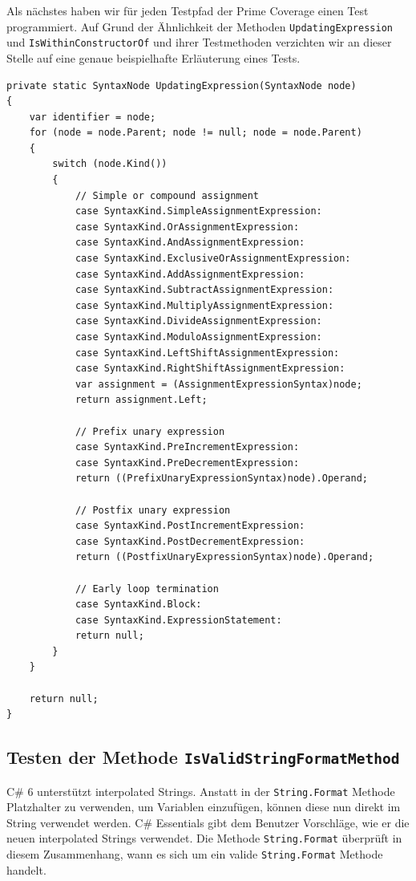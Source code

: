 Als nächstes haben wir für jeden Testpfad der Prime Coverage einen Test programmiert. Auf Grund der Ähnlichkeit der Methoden \texttt{UpdatingExpression} und \texttt{IsWithinConstructorOf} und ihrer Testmethoden verzichten wir an dieser Stelle auf eine genaue beispielhafte Erläuterung eines Tests.\newpage
\begin{lstlisting}[caption={Mehtode \texttt{UpdatingExpression}},
label=lst:code-UpdatingExpression]
private static SyntaxNode UpdatingExpression(SyntaxNode node)
{
	var identifier = node;
 	for (node = node.Parent; node != null; node = node.Parent)
 	{
 		switch (node.Kind())
 		{
 			// Simple or compound assignment
 			case SyntaxKind.SimpleAssignmentExpression:
 			case SyntaxKind.OrAssignmentExpression:
 			case SyntaxKind.AndAssignmentExpression:
 			case SyntaxKind.ExclusiveOrAssignmentExpression:
 			case SyntaxKind.AddAssignmentExpression:
 			case SyntaxKind.SubtractAssignmentExpression:
 			case SyntaxKind.MultiplyAssignmentExpression:
 			case SyntaxKind.DivideAssignmentExpression:
 			case SyntaxKind.ModuloAssignmentExpression:
 			case SyntaxKind.LeftShiftAssignmentExpression:
 			case SyntaxKind.RightShiftAssignmentExpression:
 			var assignment = (AssignmentExpressionSyntax)node;
 			return assignment.Left;
 			
 			// Prefix unary expression
 			case SyntaxKind.PreIncrementExpression:
 			case SyntaxKind.PreDecrementExpression:
 			return ((PrefixUnaryExpressionSyntax)node).Operand;
 			
 			// Postfix unary expression
 			case SyntaxKind.PostIncrementExpression:
 			case SyntaxKind.PostDecrementExpression:
 			return ((PostfixUnaryExpressionSyntax)node).Operand;
 			
 			// Early loop termination
 			case SyntaxKind.Block:
 			case SyntaxKind.ExpressionStatement:
 			return null;
 		}
 	}
 	
	return null;
}
\end{lstlisting}
\subsection{Testen der Methode \texttt{IsValidStringFormatMethod}}
C\# 6 unterstützt interpolated Strings. Anstatt in der \texttt{String.Format} Methode Platzhalter zu verwenden, um Variablen einzufügen, können diese nun direkt im String verwendet werden.\cite{csharp6} C\# Essentials gibt dem Benutzer Vorschläge, wie er die neuen interpolated Strings verwendet. Die Methode \texttt{String.Format} überprüft in diesem Zusammenhang, wann es sich um ein valide \texttt{String.Format} Methode handelt.

